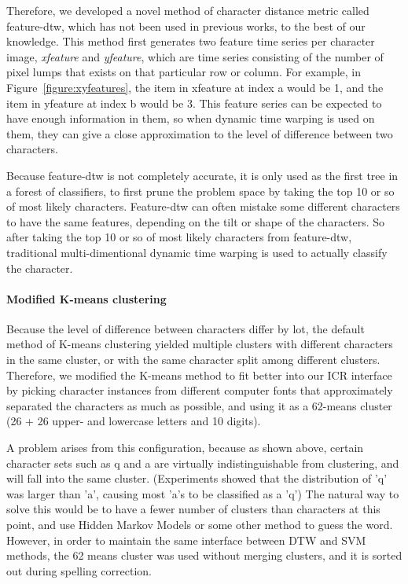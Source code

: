 \documentclass[12pt]{article}
\begin{document}
	Therefore, we developed a novel method of character distance metric called feature-dtw, which has not been used in previous works, to the best of our knowledge. This method first generates two feature time series per character image, \textit{xfeature} and \textit{yfeature}, which are time series consisting of the number of pixel lumps that exists on that particular row or column. For example, in Figure~\ref{figure:xyfeatures}, the item in xfeature at index a would be 1, and the item in yfeature at index b would be 3. This feature series can be expected to have enough information in them, so when dynamic time warping is used on them, they can give a close approximation to the level of difference between two characters.
	
	Because feature-dtw is not completely accurate, it is only used as the first tree in a forest of classifiers, to first prune the problem space by taking the top 10 or so of most likely characters. Feature-dtw can often mistake some different characters to have the same features, depending on the tilt or shape of the characters. So after taking the top 10 or so of most likely characters from feature-dtw, traditional multi-dimentional dynamic time warping is used to actually classify the character.
	
	\paragraph {Modified K-means clustering} Because the level of difference between characters differ by lot, the default method of K-means clustering yielded multiple clusters with different characters in the same cluster, or with the same character split among different clusters. Therefore, we modified the K-means method to fit better into our ICR interface by picking character instances from different computer fonts that approximately separated the characters as much as possible, and using it as a 62-means cluster (26 + 26 upper- and lowercase letters and 10 digits).
	
	A problem arises from this configuration, because as shown above, certain character sets such as q and a are virtually indistinguishable from clustering, and will fall into the same cluster. (Experiments showed that the distribution of 'q' was larger than 'a', causing most 'a's to be classified as a 'q') The natural way to solve this would be to have a fewer number of clusters than characters at this point, and use Hidden Markov Models or some other method to guess the word. However, in order to maintain the same interface between DTW and SVM methods, the 62 means cluster was used without merging clusters, and it is sorted out during spelling correction.
\end{document}
